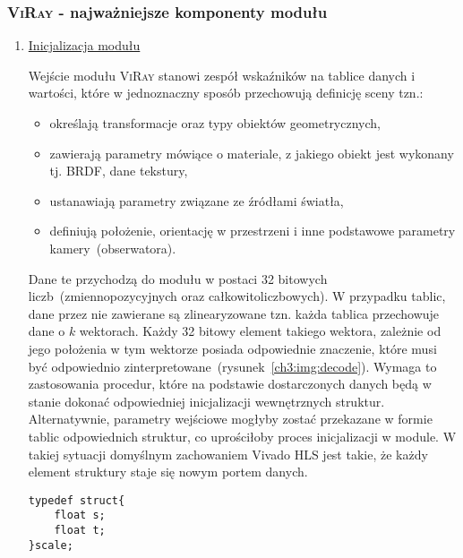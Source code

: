 \subsubsection{\textsc{ViRay} - najważniejsze komponenty modułu}
\begin{enumerate}


\item \underline{Inicjalizacja modułu}

Wejście modułu \textsc{ViRay} stanowi zespół wskaźników na tablice danych i wartości, które w jednoznaczny sposób przechowują definicję sceny tzn.:
\begin{itemize}
\item określają transformacje oraz typy obiektów geometrycznych,
\item zawierają parametry mówiące o materiale, z jakiego obiekt jest wykonany tj. BRDF, dane tekstury,
\item ustanawiają parametry związane ze źródłami światła,
\item definiują położenie, orientację w przestrzeni i inne podstawowe parametry kamery~(obserwatora).
\end{itemize}
Dane te przychodzą do modułu w postaci 32 bitowych liczb~(zmiennopozycyjnych oraz całkowitoliczbowych). W przypadku tablic, dane przez nie zawierane są zlinearyzowane tzn. każda tablica przechowuje dane o $k$ wektorach. Każdy 32 bitowy element takiego wektora, zależnie od jego położenia w tym wektorze posiada odpowiednie znaczenie, które musi być odpowiednio zinterpretowane~(rysunek~\ref{ch3:img:decode}). Wymaga to zastosowania procedur, które na podstawie dostarczonych danych będą w stanie dokonać odpowiedniej inicjalizacji wewnętrznych struktur.
Alternatywnie, parametry wejściowe mogłyby zostać przekazane w formie tablic odpowiednich struktur, co uprościłoby proces inicjalizacji w module. W takiej sytuacji domyślnym zachowaniem Vivado HLS jest takie, że każdy element struktury staje się nowym portem danych.
\begin{lstlisting}
typedef struct{
	float s;
	float t;
}scale;
\end{lstlisting}

\end{enumerate}
